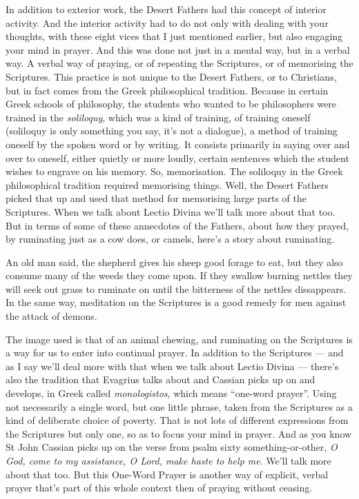 In addition to exterior work, the Desert Fathers had this concept of interior activity. And the interior activity had to do not only with dealing with your thoughts, with these eight vices that I just mentioned earlier, but also engaging your mind in prayer. And this was done not just in a mental way, but in a verbal way. A verbal way of praying, or of repeating the Scriptures, or of memorising the Scriptures. This practice is not unique to the Desert Fathers, or to Christians, but in fact comes from the Greek philosophical tradition. Because in certain Greek schools of philosophy, the students who wanted to be philosophers were trained in the \emph{soliloquy}, which was a kind of training, of training oneself (soliloquy is only something you say, it's not a dialogue), a method of training oneself by the spoken word or by writing. It consists primarily in saying over and over to oneself, either quietly or more loudly, certain sentences which the student wishes to engrave on his memory. So, memorisation. The soliloquy in the Greek philosophical tradition required memorising things. Well, the Desert Fathers picked that up and used that method for memorising large parts of the Scriptures. When we talk about Lectio Divina we'll talk more about that too. But in terms of some of these annecdotes of the Fathers, about how they prayed, by ruminating just as a cow does, or camels, here's a story about ruminating.

An old man said, the shepherd gives his sheep good forage to eat, but they also consume many of the weeds they come upon. If they swallow burning nettles they will seek out grass to ruminate on until the bitterness of the nettles dissappears. In the same way, meditation on the Scriptures is a good remedy for men against the attack of demons.

The image used is that of an animal chewing, and ruminating on the Scriptures is a way for us to enter into continual prayer. In addition to the Scriptures --- and as I say we'll deal more with that when we talk about Lectio Divina --- there's also the tradition that Evagrius talks about and Cassian picks up on and develops, in Greek called \emph{monologistos}, which means ``one-word prayer''. Using not necessarily a single word, but one little phrase, taken from the Scriptures as a kind of deliberate choice of poverty. That is not lots of different expressions from the Scriptures but only one, so as to focus your mind in prayer. And as you know St John Cassian picks up on the verse from psalm sixty something-or-other, \emph{O God, come to my assistance, O Lord, make haste to help me}. We'll talk more about that too. But this One-Word Prayer is another way of explicit, verbal prayer that's part of this whole context then of praying without ceasing.

